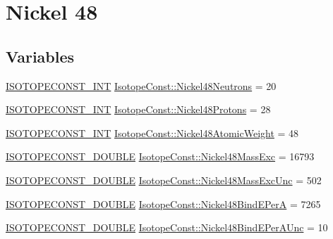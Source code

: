 \hypertarget{group___isotope_const-_nickel-_ni48}{}\section{Nickel 48}
\label{group___isotope_const-_nickel-_ni48}
\subsection*{Variables}
\begin{DoxyCompactItemize}
\item 
\mbox{\hyperlink{group___isotope_const-_macros_ga5f18360b3e99483a35c32d789e62621c}{I\+S\+O\+T\+O\+P\+E\+C\+O\+N\+S\+T\+\_\+\+I\+NT}} \mbox{\hyperlink{group___isotope_const-_nickel-_ni48_gad8dbba2b0721a41139f192f04724906d}{Isotope\+Const\+::\+Nickel48\+Neutrons}} = 20
\item 
\mbox{\hyperlink{group___isotope_const-_macros_ga5f18360b3e99483a35c32d789e62621c}{I\+S\+O\+T\+O\+P\+E\+C\+O\+N\+S\+T\+\_\+\+I\+NT}} \mbox{\hyperlink{group___isotope_const-_nickel-_ni48_gab2c76c1b83c97af4c1738b1c1b325a76}{Isotope\+Const\+::\+Nickel48\+Protons}} = 28
\item 
\mbox{\hyperlink{group___isotope_const-_macros_ga5f18360b3e99483a35c32d789e62621c}{I\+S\+O\+T\+O\+P\+E\+C\+O\+N\+S\+T\+\_\+\+I\+NT}} \mbox{\hyperlink{group___isotope_const-_nickel-_ni48_gad6c7960c99864f3c0e914af3f6b3d908}{Isotope\+Const\+::\+Nickel48\+Atomic\+Weight}} = 48
\item 
\mbox{\hyperlink{group___isotope_const-_macros_ga8f45a7272ce02c0b4c65c44636ed719a}{I\+S\+O\+T\+O\+P\+E\+C\+O\+N\+S\+T\+\_\+\+D\+O\+U\+B\+LE}} \mbox{\hyperlink{group___isotope_const-_nickel-_ni48_ga6346a9a5b402a65ae64bc39f31afed21}{Isotope\+Const\+::\+Nickel48\+Mass\+Exc}} = 16793
\item 
\mbox{\hyperlink{group___isotope_const-_macros_ga8f45a7272ce02c0b4c65c44636ed719a}{I\+S\+O\+T\+O\+P\+E\+C\+O\+N\+S\+T\+\_\+\+D\+O\+U\+B\+LE}} \mbox{\hyperlink{group___isotope_const-_nickel-_ni48_gaa30238104ad6b959d39bd03cbf31253e}{Isotope\+Const\+::\+Nickel48\+Mass\+Exc\+Unc}} = 502
\item 
\mbox{\hyperlink{group___isotope_const-_macros_ga8f45a7272ce02c0b4c65c44636ed719a}{I\+S\+O\+T\+O\+P\+E\+C\+O\+N\+S\+T\+\_\+\+D\+O\+U\+B\+LE}} \mbox{\hyperlink{group___isotope_const-_nickel-_ni48_ga175692733455ade90e419b90f883f608}{Isotope\+Const\+::\+Nickel48\+Bind\+E\+PerA}} = 7265
\item 
\mbox{\hyperlink{group___isotope_const-_macros_ga8f45a7272ce02c0b4c65c44636ed719a}{I\+S\+O\+T\+O\+P\+E\+C\+O\+N\+S\+T\+\_\+\+D\+O\+U\+B\+LE}} \mbox{\hyperlink{group___isotope_const-_nickel-_ni48_ga033545906e365a3cc344555baca87fc7}{Isotope\+Const\+::\+Nickel48\+Bind\+E\+Per\+A\+Unc}} = 10

\end{DoxyCompactItemize}
